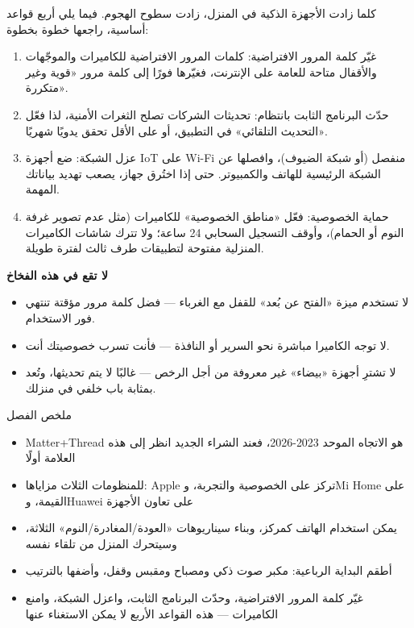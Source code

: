 
كلما زادت الأجهزة الذكية في المنزل، زادت سطوح الهجوم. فيما يلي أربع قواعد أساسية، راجعها خطوة بخطوة:

\begin{enumerate}
  \item غيّر كلمة المرور الافتراضية: كلمات المرور الافتراضية للكاميرات والموجّهات والأقفال متاحة للعامة على الإنترنت، فغيّرها فورًا إلى كلمة مرور «قوية وغير متكررة».
  \item حدّث البرنامج الثابت بانتظام: تحديثات الشركات تصلح الثغرات الأمنية، لذا فعّل «التحديث التلقائي» في التطبيق، أو على الأقل تحقق يدويًا شهريًا.
  \item عزل الشبكة: ضع أجهزة IoT على Wi-Fi منفصل (أو شبكة الضيوف)، وافصلها عن الشبكة الرئيسية للهاتف والكمبيوتر. حتى إذا اختُرق جهاز، يصعب تهديد بياناتك المهمة.
  \item حماية الخصوصية: فعّل «مناطق الخصوصية» للكاميرات (مثل عدم تصوير غرفة النوم أو الحمام)، وأوقف التسجيل السحابي 24 ساعة؛ ولا تترك شاشات الكاميرات المنزلية مفتوحة لتطبيقات طرف ثالث لفترة طويلة.
\end{enumerate}

\textbf{لا تقع في هذه الفخاخ}\par

\begin{itemize}
  \item لا تستخدم ميزة «الفتح عن بُعد» للقفل مع الغرباء — فضل كلمة مرور مؤقتة تنتهي فور الاستخدام.
  \item لا توجه الكاميرا مباشرة نحو السرير أو النافذة — فأنت تسرب خصوصيتك أنت.
  \item لا تشترِ أجهزة «بيضاء» غير معروفة من أجل الرخص — غالبًا لا يتم تحديثها، وتُعد بمثابة باب خلفي في منزلك.
\end{itemize}

\begin{tcbsummary}{ملخص الفصل}
\begin{itemize}
  \item Matter+Thread هو الاتجاه الموحد 2023-2026، فعند الشراء الجديد انظر إلى هذه العلامة أولًا
  \item للمنظومات الثلاث مزاياها: Apple تركز على الخصوصية والتجربة، وMi Home على القيمة، وHuawei على تعاون الأجهزة
  \item يمكن استخدام الهاتف كمركز، وبناء سيناريوهات «العودة/المغادرة/النوم» الثلاثة، وسيتحرك المنزل من تلقاء نفسه
  \item أطقم البداية الرباعية: مكبر صوت ذكي ومصباح ومقبس وقفل، وأضفها بالترتيب
  \item غيّر كلمة المرور الافتراضية، وحدّث البرنامج الثابت، واعزل الشبكة، وامنع الكاميرات — هذه القواعد الأربع لا يمكن الاستغناء عنها
\end{itemize}

\end{tcbsummary}
